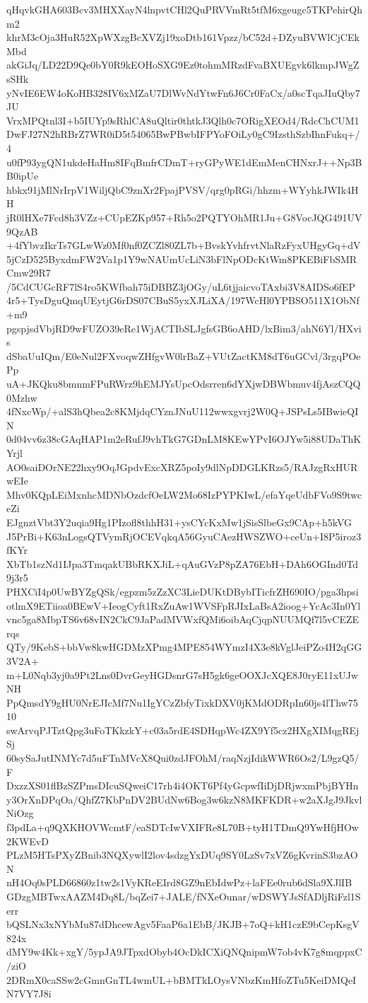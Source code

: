 qHqvkGHA603Bcv3MHXXayN4lnpvtCHl2QuPRVVmRt5tfM6xgeugc5TKPehirQhm2
khrM3cOja3HuR52XpWXzgBcXVZj19xoDtb161Vpzz/bC52d+DZyuBVWlCjCEkMbd
akGiJq/LD22D9Qe0bY0R9kEOHoSXG9Ez0tohmMRzdFvaBXUEgvk6lkmpJWgZsSHk
yNvIE6EW4oKoHB328IV6xMZaU7DlWvNdYtwFn6J6Cr0FaCx/a0scTqaJIuQby7JU
VrxMPQtnl3I+b5IUYp9sRhlCA8uQltir0thtkJ3Qlh0c7ORigXEOd4/RdcChCUM1
DwFJ27N2hRBrZ7WR0iD5t54065BwPBwbIFPYoFOiLy0gC9IzsthSzbIhnFukq+/4
u0fP93ygQN1ukdeHaHm8IFqBmfrCDmT+ryGPyWE1dEmMenCHNxrJ++Np3BB0ipUe
hbkx91jMlNrIrpV1WiljQbC9znXr2FpajPVSV/qrg0pRGi/hhzm+WYyhkJWIk4HH
jR0lHXe7Fcd8h3VZz+CUpEZKp957+Rh5o2PQTYOhMR1Ju+G8VocJQG491UV9QzAB
+4fYbvzIkrTs7GLwWz0Mf0nf0ZCZl80ZL7b+BvskYvhfrvtNlaRzFyxUHgyGq+dV
5jCzD525ByxdmFW2Va1p1Y9wNAUmUcLiN3bFlNpODcKtWm8PKEBiFbSMRCmw29R7
/5CdCUGcRF7lS4ro5KWfbah75iDBBZ3jOGy/uL6tjjaicvoTAxbi3V8AIDSo6fEP
4r5+TysDguQmqUEytjG6rDS07CBuS5yxXJLiXA/197WcHl0YPBSO511X1ObNf+m9
pgspjsdVbjRD9wFUZO39eRe1WjACTIbSLJgfsGB6oAHD/lxBim3/ahN6Yl/HXvis
dSbaUuIQm/E0eNul2FXvoqwZHfgvW0lrBaZ+VUtZactKM8dT6uGCvl/3rgqPOePp
uA+JKQku8bmnmFPuRWrz9hEMJYsUpcOdsrren6dYXjwDBWbmuv4fjAszCQQ0Mzhw
4fNxcWp/+alS3hQbea2c8KMjdqCYznJNuU112wwxgvrj2W0Q+JSPsLs5IBwieQIN
0d04vv6z38cGAqHAP1m2eRufJ9vhTkG7GDnLM8KEwYPvI6OJYw5i88UDaThKYrjl
AO0saiDOrNE22hxy9OqJGpdvExcXRZ5poIy9dlNpDDGLKRzs5/RAJzgRxHURwEIe
Mhv0KQpLEiMxnhcMDNbOzdcfOeLW2Mo68IzPYPKIwL/efaYqeUdbFVo9S9twceZi
EJgnztVbt3Y2uqia9Hg1PIzofl8thhH31+ysCYcKxMw1jSisSlbeGx9CAp+h5kVG
J5PrBi+K63nLogsQTVymRjOCEVqkqA56GyuCAezHWSZWO+ceUn+I8P5iroz3fKYr
XbTb1szNd1IJpa3TmqakUBbRKXJiL+qAuGVzP8pZA76EbH+DAh6OGInd0Td9j3r5
PHXCiI4p0UwBYZgQSk/egpzm5zZzXC3LieDUKtDBybITicfrZH690IO/pga3hpsi
otlmX9ETiioa0BEwV+IeogCyft1RxZuAw1WVSFpRJIxLaBsA2ioog+YcAc3In0Yl
vnc5ga8MbpTS6v68vIN2CkC9JaPadMVWxfQMi6oibAqCjqpNUUMQf7l5vCEZErqs
QTy/9KebS+bbVw8kwHGDMzXPmg4MPE854WYmzI4X3e8kVglJeiPZo4H2qGG3V2A+
m+L0Nqb3yj0a9Pt2Lns0DvrGeyHGDsnrG7sH5gk6geOOXJcXQE8J0ryE11xUJwNH
PpQmsdY9gHU0NrEJIcMf7Nu1IgYCzZbfyTixkDXV0jKMdODRpIn60js4lThw7510
swArvqPJTztQpg3uFoTKkzkY+c03a5rdE4SDHqpWc4ZX9Yf5cz2HXgXIMqgREjSj
60sySaJutINMYc7d5uFTnMVcX8Qui0zdJFOhM/raqNzjIdikWWR6Os2/L9gzQ5/F
DxzzXS01flBzSZPmsDIcuSQweiC17rh4i4OKT6Pf4yGcpwfIiDjDRjwxmPbjBYHn
y3OrXnDPqOa/QhfZ7KbPnDV2BUdNw6Bog3w6kzN8MKFKDR+w2aXJgJ9JkvlNiOzg
f3pdLa+q9QXKHOVWcmtF/eaSDTcIwVXIFRe8L70B+tyH1TDmQ9YwHfjHOw2KWEvD
PLzM5HTsPXyZBnib3NQXywlI2lov4sdzgYxDUq9SY0LzSv7xVZ6gKvrinS3bzAON
nH4Oq0sPLD66860z1tw2s1VyKReEIrd8GZ9nEbIdwPz+laFEe0rub6dSla9XJlIB
GDzgMBTwxAAZM4Dq8L/bqZei7+JALE/fNXeOunar/wDSWYJsSfADljRiFzl1Serr
bQSLNx3xNYbMu87dDhcewAgv5FaaP6a1EbB/JKJB+7oQ+kH1czE9bCepKsgV824x
dMY9w4Kk+xgY/5ypJA9JTpxdObyb4OcDkICXiQNQnipmW7ob4vK7g8mqppxC/ziO
2DRmX0caSSw2cGmnGnTL4wmUL+bBMTkLOysVNbzKmHfoZTu5KeiDMQeIN7VY7J8i
